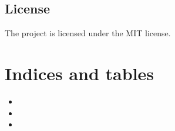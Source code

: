 \documentclass[letterpaper,10pt,english]{sphinxmanual}
\begin{document}
\section{License}
\label{\detokenize{index:license}}
The project is licensed under the MIT license.


\chapter{Indices and tables}
\label{\detokenize{index:indices-and-tables}}\begin{itemize}
\item {} 

\item {} 

\item {} 

\end{itemize}



\renewcommand{\indexname}{Index}
\printindex
\end{document}
